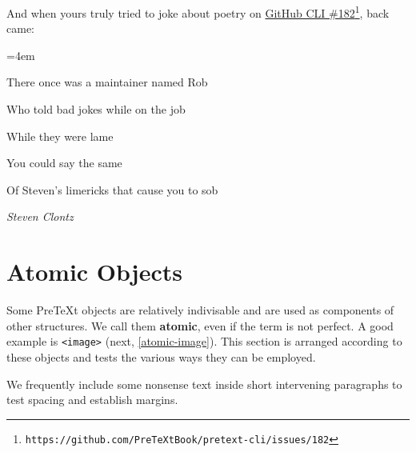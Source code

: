 \documentclass{sn-jnl}
\theoremstyle{thmstyleone}%
\theoremstyle{thmstyletwo}%
\theoremstyle{thmstylethree}%
\newcommand{\xreffont}{\relax}
\newcommand{\mono}[1]{\texttt{#1}}
\newcommand{\terminology}[1]{\textbf{#1}}
\numberwithin{equation}{section}
\newenvironment{poem}{\setlength{\parindent}{0em}}{}
\newcommand{\poemTitle}[1]{\begin{center}\large\textbf{#1}\end{center}}
\newenvironment{stanza}{\vspace{0.25 em}\hangindent=4em}{\vspace{1 em}}
\newcommand{\poemauthorleft}[1]{\vspace{-1em}\begin{flushleft}\textit{#1}\end{flushleft}}
\newcommand{\poemlineleft}[1]{{\raggedright{#1}\par}\vspace{-\parskip}}
\begin{document}
And when yours truly tried to joke about poetry on \href{https://github.com/PreTeXtBook/pretext-cli/issues/182}{GitHub CLI \#182}\footnote{\nolinkurl{https://github.com/PreTeXtBook/pretext-cli/issues/182}\label{section-poetry-6-2}}, back came:%
\begin{poem}\label{limerick-clontz}%
\poemTitle{}
\begin{stanza}
\poemlineleft{There once was a maintainer named Rob}
\poemlineleft{Who told bad jokes while on the job}
\poemlineleft{While they were lame}
\poemlineleft{You could say the same}
\poemlineleft{Of Steven's limericks that cause you to sob}
\end{stanza}
\poemauthorleft{Steven Clontz}
\end{poem}
%
%
\typeout{************************************************}
\typeout{************************************************}
%
\section{Atomic Objects}\label{section-atomic-items}%
Some PreTeXt objects are relatively indivisable and are used as components of other structures.  We call them \terminology{atomic}, even if the term is not perfect.  A good example is \mono{<image>} (next, \hyperref[atomic-image]{{\xreffont\ref{atomic-image}}}).  This section is arranged according to these objects and tests the various ways they can be employed.%
\par
We frequently include some nonsense text inside short intervening paragraphs to test spacing and establish margins.%
%
%
\typeout{************************************************}
\typeout{Subsection 1 \mono{<image>}}
\typeout{************************************************}
%
\end{document}
